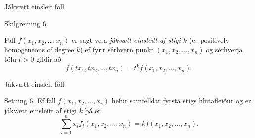 \begin{frame}{Jákvætt einsleit föll} 

\begin {block}{Skilgreining 6.}

Fall $f(x_1, x_2, \ldots, x_n)$ er sagt vera {\em jákvætt einsleitt af stigi $k$} (e.~positively homogeneous of degree $k$) ef fyrir sérhvern punkt $(x_1, x_2, \ldots, x_n)$ og sérhverja tölu $t>0$ gildir að 
$$f(tx_1, tx_2, \ldots, tx_n)=t^kf(x_1, x_2, \ldots, x_n).$$
\end{block}

\end{frame}



\begin{frame}{Jákvætt einsleit föll} 

\begin {block}{Setning 6.}
 Ef fall $f(x_1, x_2, \ldots, x_n)$ hefur samfelldar fyrsta stigs hlutafleiður og er jákvætt einsleitt af stigi $k$ þá er 
$$\sum_{i=1}^n x_if_i(x_1, x_2, \ldots, x_n)=kf(x_1, x_2, \ldots, x_n).$$ 
 \end{block}

\end{frame}

